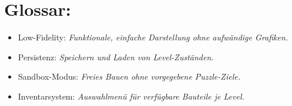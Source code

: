 \documentclass[]{exercise}
\begin{document}
    \section{Glossar:}
    \begin{itemize}
        \item Low-Fidelity: \textit{Funktionale, einfache Darstellung ohne aufwändige Grafiken.}
        \item Persistenz: \textit{Speichern und Laden von Level-Zuständen.}
        \item Sandbox-Modus: \textit{Freies Bauen ohne vorgegebene Puzzle-Ziele.}
        \item Inventarsystem: \textit{Auswahlmenü für verfügbare Bauteile je Level.}
    \end{itemize}
\end{document}
